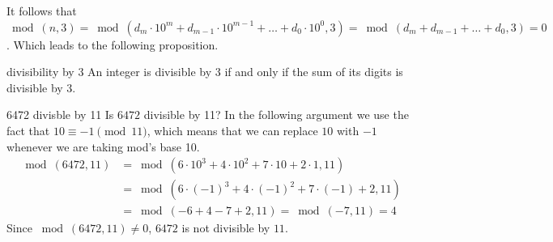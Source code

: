 It follows that $\bmod(n,3)=\bmod(d_m\cdot 10^m+d_{m-1}\cdot 10^{m-1}+\dots +d_{0}\cdot 10^0,3)=\bmod(d_{m}+d_{m-1}+\dots+d_{0},3)=0$. Which leads to the following proposition.

\begin{prop}{divisibility by 3}
An integer is divisible by 3 if and only if the sum of its digits is divisible by 3.
\end{prop}

\begin{example}{6472 divisble by 11}
Is $6472$ divisible by 11? In the following argument we use the fact that $10 \equiv-1\pmod{11}$, which means that we can replace $10$ with $-1$ whenever we are taking mod's base 10.
\begin{align*}
\bmod(6472,11)&=\bmod(6\cdot 10^{3}+4\cdot 10^{2}+7\cdot 10+2\cdot 1,11) \\
&=\bmod(6\cdot (-1)^{3}+4\cdot (-1)^{2} + 7\cdot (-1) + 2,11)\\
&=\bmod(-6+4-7+2,11)=\bmod(-7,11)=4
\end{align*}
Since $\bmod(6472,11)\neq 0$, $6472$ is not divisible by $11$.
\end{example}

